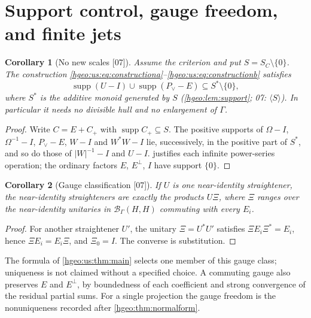 \documentclass[11pt,letterpaper]{article}
\numberwithin{equation}{section}
\newtheorem{corollary}[corollary]{Corollary}
\theoremstyle{definition}
\theoremstyle{remark}
\newcommand{\BH}{\mathscr B_\Gamma(H,H)}
\newcommand{\supp}{\operatorname{supp}}
\newcommand{\abs}[1]{\lvert #1\rvert}
\newcommand{\src}[1]{\textup{\textsf{\small[#1]}}}
\begin{document}
\section{Support control, gauge freedom, and finite jets}
\label{hgeo:us:sec:consequences}

\begin{corollary}[No new scales \src{07}]\label{hgeo:us:cor:support}
Assume the criterion and put $S=S_C\setminus\{0\}$. The construction
\eqref{hgeo:us:eq:constructiona}--\eqref{hgeo:us:eq:constructionb} satisfies
\[
 \supp(U-I)\cup\supp(P_\vee-E)\subseteq S^*\setminus\{0\},
\]
where $S^*$ is the additive monoid generated by $S$
(\cref{hgeo:lem:support}; 07: $\langle S\rangle$). In particular it needs no
divisible hull and no enlargement of $\Gamma$.
\end{corollary}
\begin{proof}
Write $C=E+C_+$ with $\supp C_+\subseteq S$. The positive supports of
$\Omega-I$, $\Omega^{-1}-I$, $P_\vee-E$, $W-I$ and $W^*W-I$ lie, successively,
in the positive part of $S^*$, and so do those of $\abs W^{-1}-I$ and $U-I$.
 justifies each infinite power-series operation; the
ordinary factors $E$, $E^\perp$, $I$ have support $\{0\}$.
\end{proof}

\begin{corollary}[Gauge classification \src{07}]\label{hgeo:us:cor:gauge}
If $U$ is one near-identity straightener, the near-identity straighteners are
exactly the products $U\Xi$, where $\Xi$ ranges over the near-identity
unitaries in $\BH$ commuting with every $E_i$.
\end{corollary}
\begin{proof}
For another straightener $U'$, the unitary $\Xi=U^*U'$ satisfies
$\Xi E_i\Xi^*=E_i$, hence $\Xi E_i=E_i\Xi$, and $\Xi_0=I$. The converse is
substitution.
\end{proof}

The formula of \cref{hgeo:us:thm:main} selects one member of this gauge
class; uniqueness is not claimed without a specified choice. A commuting gauge
also preserves $E$ and $E^\perp$, by boundedness of each coefficient and
strong convergence of the residual partial sums. For a single projection the
gauge freedom is the nonuniqueness recorded after \cref{hgeo:thm:normalform}.
\end{document}
